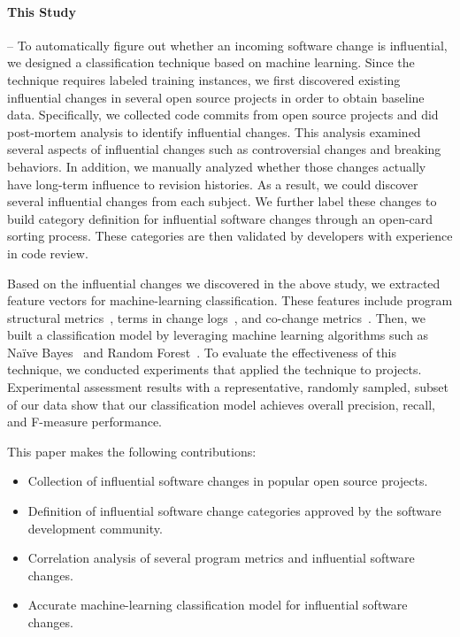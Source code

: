\paragraph*{\bf This Study} -- To automatically figure out whether an incoming software change is influential, we
designed a classification technique based on machine learning. Since
the technique requires labeled training instances, we first discovered existing
influential changes in several open source projects in order to obtain baseline
data. Specifically, we collected \numChanges code commits from \numSubjects open source projects and did
post-mortem analysis to identify influential changes. This analysis examined
several aspects of influential changes such as controversial changes and breaking
behaviors. In addition, we manually analyzed whether those changes actually have
long-term influence to revision histories.
As a result, we could discover several influential changes from each subject.
We further label these changes to build category definition for influential software changes
through an open-card sorting process. These categories are then validated by
developers with experience in code review.   

Based on the influential changes we discovered in the above study, we extracted
feature vectors for machine-learning classification. These features include program structural
metrics~\cite{kim_classifying_2008}, terms in change
logs~\cite{kim_classifying_2008}, and co-change metrics~\cite{Beyer05}.
Then, we built a classification model by leveraging machine learning algorithms such as
Na\"{i}ve Bayes~\cite{lewis:ecml:1998,mlbook} and Random
Forest~\cite{breiman_random_2001}.
To evaluate the effectiveness of this technique, we conducted experiments that
applied the technique to \numSubjects projects.
Experimental assessment results with a representative, randomly sampled, subset of our data show that 
our classification model achieves overall
\precisionwild precision, \recallwild recall, and \fmeasurewild F-measure performance.

This paper makes the following contributions:

\begin{itemize}
\itemsep0em 
	\item Collection of influential software changes in popular open source projects.
	\item Definition of influential software change categories approved by the software development community.
	\item Correlation analysis of several program metrics and influential software
changes.
	\item Accurate machine-learning classification model for influential software changes.
\end{itemize}

